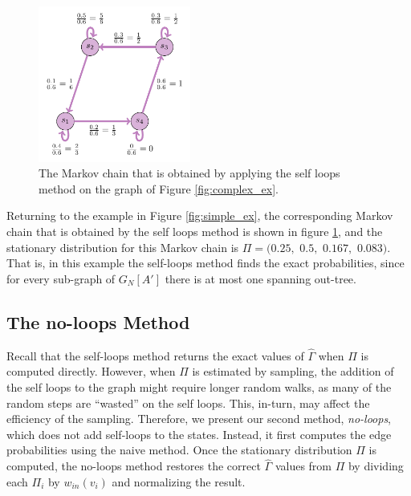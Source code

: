\documentclass[sigconf,anonymous]{aamas}
\begin{document}
\begin{figure}[hbpt] 
    \centering
    \includegraphics[width= 5cm]{self_loop_markov_chain_simple_graph.pdf}
  \caption{The Markov chain that is obtained by applying the self loops method on the graph of Figure \ref{fig:complex_ex}.}
    \label{fig simple self loops markov chain}
\end{figure}

Returning to the example in Figure \ref{fig:simple_ex}, the corresponding Markov chain that is obtained by the self loops method is shown in figure \ref{fig simple self loops markov chain}, and the stationary distribution for this Markov chain is $\Pi=(0.25,$ $ 0.5,$ $ 0.167,$ $0.083)$. 
That is, in this example the self-loops method finds the exact probabilities, since for every sub-graph of $G_N[A']$ there is at most one spanning out-tree. %





\subsection{The no-loops Method}
Recall that the self-loops method returns the exact values of $\hat{\Gamma}$ when $\Pi$ is computed directly. However, when $\Pi$ is estimated by sampling, the addition of the self loops to the graph might require longer random walks, as many of the random steps are ``wasted'' on the self loops. This, in-turn, may affect the efficiency of the sampling.
Therefore, we present our second method, \textit{no-loops}, which does not add self-loops to the states. Instead, it first computes the edge probabilities using the naive method. Once the stationary distribution $\Pi$ is computed, the no-loops method restores the correct $\hat{\Gamma}$ values from $\Pi$ by dividing each $\Pi_i$ by $w_{in}(v_i)$ and normalizing the result.
\end{document}
